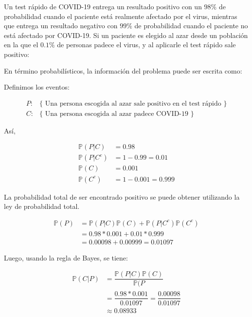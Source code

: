 
\addpoints
\question[15] Un test rápido de COVID-19 entrega un resultado positivo con un $98\%$ de probabilidad cuando el paciente está realmente afectado por el virus, mientras que entrega un resultado negativo con $99\%$ de probabilidad cuando el paciente no está afectado por COVID-19. Si un paciente es elegido al azar desde un población en la que el $0.1\%$ de personas padece el virus, y al aplicarle el test rápido sale positivo:

\noaddpoints


\begin{solution}
En término probabilísticos, la información del problema puede ser escrita como:

Definimos los eventos:

\begin{align*}
P: &\{ \text{ Una persona escogida al azar sale positivo en el test rápido }\}\\
C: &\{ \text{  Una persona escogida al azar padece COVID-19 }\}
\end{align*}

Así,

\begin{align*}
\mathbb{P}(P|C) &= 0.98 \\
\mathbb{P}(P|C^c) &= 1-0.99 = 0.01 \\
\mathbb{P}(C) &= 0.001\\
\mathbb{P}(C^c) &= 1 - 0.001 = 0.999
\end{align*}

La probabilidad total de ser encontrado positivo se puede obtener utilizando la ley de probabilidad total.

\begin{align*}
\mathbb{P}(P)&=\mathbb{P}(P|C)\mathbb{P}(C)+\mathbb{P}(P|C^c)\mathbb{P}(C^c) \\
&= 0.98 * 0.001 + 0.01 * 0.999 \\
&= 0.00098 + 0.00999 = 0.01097
\end{align*}

Luego, usando la regla de Bayes, se tiene:

\begin{align*}
\mathbb{P}(C|P)&=\dfrac{\mathbb{P}(P|C)\mathbb{P}(C)}{\mathbb{P}(P}\\
&=\dfrac{0.98*0.001}{0.01097} = \dfrac{0.00098}{0.01097}\\
&\approx 0.08933
\end{align*}

\end{solution}